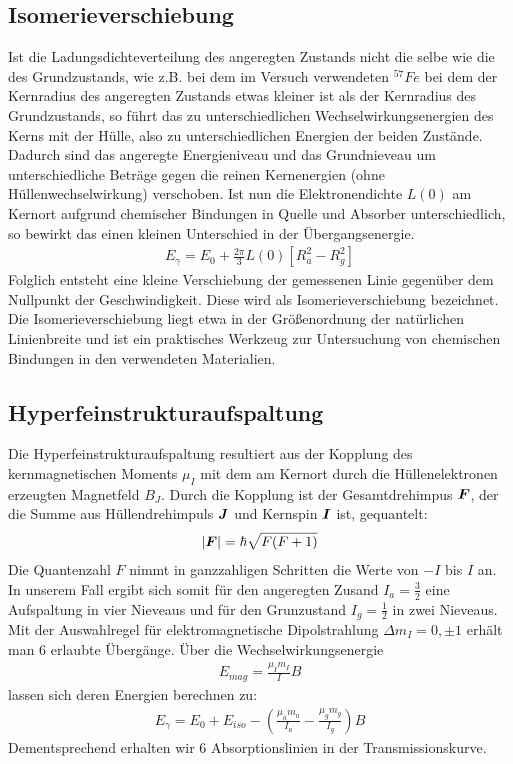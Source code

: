 \documentclass[12pt]{article}
\renewcommand*\vec[1]{{\mbox{\boldmath\ensuremath{#1}}}}
\begin{document}
\subsection{Isomerieverschiebung}
Ist die Ladungsdichteverteilung des angeregten Zustands nicht die selbe wie die des Grundzustands, wie z.B. bei dem im Versuch verwendeten $^{57}Fe$ bei dem der Kernradius
des angeregten Zustands etwas kleiner ist als der Kernradius des Grundzustands, so führt das zu unterschiedlichen Wechselwirkungsenergien des Kerns mit
der Hülle, also zu unterschiedlichen Energien der beiden Zustände. Dadurch sind das angeregte Energieniveau und das Grundnieveau um unterschiedliche Beträge gegen die
reinen Kernenergien (ohne Hüllenwechselwirkung) verschoben. Ist nun die Elektronendichte $L(0)$ am Kernort aufgrund chemischer Bindungen in Quelle und Absorber unterschiedlich,
so bewirkt das einen kleinen Unterschied in der Übergangsenergie.
\begin{align}
 E_\gamma = E_0 + \frac{2\pi}{3} L(0) \left[ R_a^2 - R_g^2\right]
\end{align}
Folglich entsteht eine kleine Verschiebung der gemessenen Linie gegenüber dem Nullpunkt der Geschwindigkeit. Diese wird als Isomerieverschiebung bezeichnet. Die Isomerieverschiebung
liegt etwa in der Größenordnung der natürlichen Linienbreite und ist ein praktisches Werkzeug zur Untersuchung von chemischen Bindungen in den verwendeten Materialien.

\subsection{Hyperfeinstrukturaufspaltung}
Die Hyperfeinstrukturaufspaltung resultiert aus der Kopplung des kernmagnetischen Moments $\mu_I$ mit dem am Kernort durch die Hüllenelektronen erzeugten Magnetfeld $B_J$.
Durch die Kopplung ist der Gesamtdrehimpus $\vec{F}$, der die Summe aus Hüllendrehimpuls $\vec{J}$ und Kernspin $\vec{I}$ ist, gequantelt:
\begin{align}
 \left|\vec{F}\right| = \hbar \sqrt{F(F+1)}
\end{align}
Die Quantenzahl $F$ nimmt in ganzzahligen Schritten die Werte von $-I$ bis $I$ an.
In unserem Fall ergibt sich somit für den angeregten Zusand $I_a = \frac{3}{2}$ eine Aufspaltung in vier Nieveaus und für den Grunzustand $I_g = \frac{1}{2}$ in zwei Nieveaus.
Mit der Auswahlregel für elektromagnetische Dipolstrahlung $\Delta m_I = 0, \pm 1$ erhält man $6$ erlaubte Übergänge. Über die Wechselwirkungsenergie
\begin{align}
 E_{mag} = \frac{\mu_I m_I}{I} B
\end{align}
lassen sich deren Energien berechnen zu:
\begin{align}
 E_\gamma = E_0 + E_{iso} - \left(\frac{\mu_a m_a}{I_a} - \frac{\mu_g m_g}{I_g} \right) B
\end{align}
Dementsprechend erhalten wir 6 Absorptionslinien in der Transmissionskurve.
\end{document}
